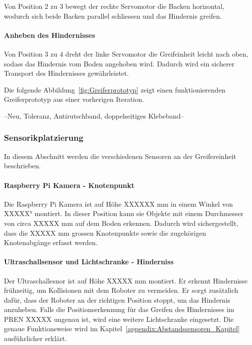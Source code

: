 \documentclass[main.tex]{subfiles} %
\begin{document}
Von Position 2 zu 3 bewegt der rechte Servomotor die Backen horizontal, wodurch sich beide Backen parallel schliessen und das Hindernis greifen.

\paragraph{Anheben des Hindernisses} 

Von Position 3 zu 4 dreht der linke Servomotor die Greifeinheit leicht nach oben, sodass das Hindernis vom Boden angehoben wird. 
Dadurch wird ein sicherer Transport des Hindernisses gewährleistet.



\newpage

Die folgende Abbildung~\ref{fig:Greiferprototyp} zeigt einen funktionierenden Greiferprototyp 
aus einer vorherigen Iteration.


--Neu, Toleranz, Antirutschband, doppelseitiges Klebeband--

\subsubsection*{Sensorikplatzierung}

In diesem Abschnitt werden die verschiedenen Sensoren an der Greifereinheit beschrieben.

\paragraph{Raspberry Pi Kamera - Knotenpunkt}
Die Raspberry Pi Kamera ist auf Höhe XXXXXX mm in einem Winkel von XXXXX° montiert.
In dieser Position kann sie Objekte mit einem Durchmesser von circa XXXXX mm auf dem Boden erkennen.
Dadurch wird sichergestellt, dass die XXXXX mm grossen Knotenpunkte sowie die zugehörigen
Knotenabgänge erfasst werden.


\paragraph{Ultraschallsensor und Lichtschranke - Hinderniss}
Der Ultraschallesnor ist auf Höhe XXXXX mm montiert. Er erkennt Hindernisse frühzeitig,
um Kollisionen mit dem Roboter zu vermeiden. Er sorgt zusätzlich dafür, dass der Roboter an der richtigen 
Position stoppt, um das Hindernis anzuheben. Falls die Positionserkennung für das Greifen 
des Hindernisses im PREN XXXXX ungenau ist, wird eine weitere Lichtschranke eingesetzt.
Die genaue Funktionsweise wird im Kapitel~\ref{appendix:Abstandssensoren_Kapitel} ausführlicher erklärt.
\end{document}
